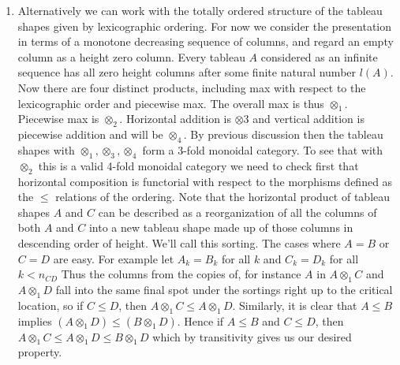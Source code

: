 \documentclass{tac}
\begin{document}
{\begin{enumerate}
   Since we are working with sequences there are also inherited max products as dicussed in the first example.
   The new max with respect to the height preordering is defined as $\max(A,B) = A$ if $B\le A$ and $ = B$ otherwise.
   The piecewise application of max with respect to the ordering of natural numbers results in taking a union
   of the two tableau shapes. 
   Above, $\max(A,B) = B$ and the piecewise max becomes
   $$
   \xymatrix@W=1.8pc @H=1.8pc @R=0pc @C=0pc @*[F-]{~&~&~&~\\~\\~}
   $$
   Both of these latter products are equivalent to the horizontal composition $\otimes_1.$
\item   
Alternatively we can work with the totally ordered structure of the 
tableau shapes given by lexicographic ordering. 
For now we consider the presentation in terms of a monotone decreasing sequence of columns, and regard
an empty column as a height zero column. Every tableau $A$ considered
as an infinite sequence has all zero height columns after some finite natural number $l(A)$. 
Now there are four distinct products, including max with respect to the lexicographic order and piecewise max.
The overall max is thus $\otimes_1.$ Piecewise max is
$\otimes_2.$ Horizontal addition is $\otimes 3$ and vertical addition is 
piecewise addition and will be $\otimes_4.$ By previous discussion
then the tableau shapes with $\otimes_1, \otimes_3, \otimes_4$ form a 3-fold monoidal category.
To see that with $\otimes_2$ this is a valid 4-fold monoidal category  
we need to check first 
that horizontal composition is functorial with respect to the morphisms defined as the $\le$ relations 
of the ordering.  
Note that the horizontal product of tableau shapes $A$ and $C$ can be described as
a reorganization of all the columns of both $A$ and $C$ into a new tableau shape made up of those columns in
 descending order of height. 
 We'll call this sorting.  The cases where
 $A=B$ or $C=D$ are easy. For example let $A_k = B_k$ for all $k$ and
$C_k = D_k$ for all $k < n_{CD}$ Thus the columns from the copies of, for instance $A$ in $A\otimes_1 C$ and 
$A\otimes_1 D$ fall into the same final spot under the sortings right up to the critical location, so
if $C \le D$, then $A\otimes_1 C \le A\otimes_1 D.$
Similarly, it is clear that $A \le B$ implies $(A \otimes_1 D) \le (B \otimes_1 D).$ 
Hence if $A\le B$ and $C\le D$, then
        $A\otimes_1 C \le A\otimes_1 D \le B\otimes_1 D$ which by transitivity gives us our desired property. 





\end{enumerate}}
\end{document}
